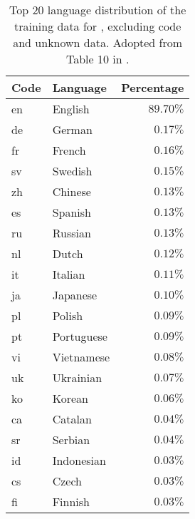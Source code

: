 \begin{table}[!htbp]
    \small
    \centering
    \alternaterowcolors
    \begin{tabular}{llr}
        \toprule
            \bfseries Code & \bfseries Language & \bfseries Percentage \\
        \midrule
            en & English & $89.70 \%$ \\
            de & German & $0.17 \%$ \\ 
            fr & French & $0.16 \%$ \\
            sv & Swedish & $0.15 \%$ \\
            zh & Chinese & $0.13 \%$ \\
            es & Spanish & $0.13 \%$ \\
            ru & Russian & $0.13 \%$ \\
            nl & Dutch & $0.12 \%$ \\
            it & Italian & $0.11 \%$ \\
            ja & Japanese & $0.10 \%$ \\
            pl & Polish & $0.09 \%$ \\
            pt & Portuguese & $0.09 \%$ \\
            vi & Vietnamese & $0.08 \%$ \\
            uk & Ukrainian & $0.07 \%$ \\
            ko & Korean & $0.06 \%$ \\
            ca & Catalan & $0.04 \%$ \\
            sr & Serbian & $0.04 \%$ \\
            id & Indonesian & $0.03 \%$ \\
            cs & Czech & $0.03 \%$ \\
            fi & Finnish & $0.03 \%$ \\
        \bottomrule
    \end{tabular}
    \caption{Top 20 language distribution of the training data for \llamaTwo, excluding code and unknown data. Adopted from Table 10 in \citet{llama2}.}
    \vspace{-.2cm}
    \label{tab:llama2_top_20_lang}
\end{table}

